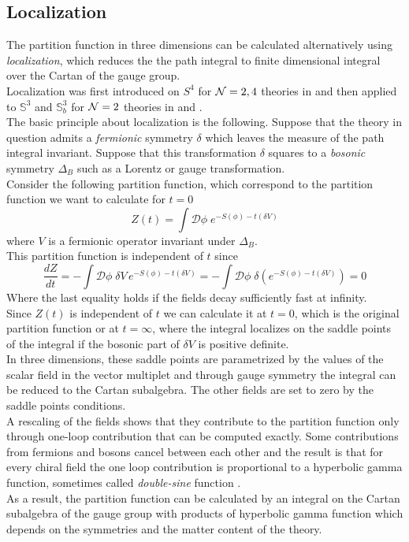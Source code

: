 \subsection{Localization}
The partition function in three dimensions can be calculated alternatively using \emph{localization}, which reduces the the path integral to finite dimensional integral over the Cartan of the gauge group.\\
Localization was first introduced on $S^4$ for $\mathcal{N}=2,4$ theories in \cite{Pestun:2007rz} and then applied to $\mathbb{S}^3$ and $\mathbb{S}_b^3$ for $\mathcal{N}=2$ theories in \cite{Kapustin:2009kz} and \cite{Hama:2011ea}.\\
The basic principle about localization is the following.
Suppose that the theory in question admits a \emph{fermionic} symmetry $\delta$ which leaves the measure of the path integral invariant.
Suppose that this transformation $\delta$ squares to a \emph{bosonic} symmetry $\Delta_B$ such as a Lorentz or gauge transformation.\\
Consider the following partition function, which correspond to the partition function we want to calculate for $t=0$
\begin{equation}
Z(t) = \int \mathcal{D} \phi \; e^{- S(\phi) - t (\delta V)}
\end{equation}
where $V$ is a fermionic operator invariant under $\Delta_B$.\\
This partition function is independent of $t$ since
\begin{equation}
 \frac{d Z}{d t} = - \int \mathcal{D} \phi \; \delta V \, e^{- S(\phi) - t (\delta V)} =  - \int  \mathcal{D} \phi \; \delta \left( e^{- S(\phi) - t (\delta V)  }\right) = 0
\end{equation}
Where the last equality holds if the fields decay sufficiently fast at infinity.\\
Since $Z(t)$ is independent of $t$ we can calculate it at $t=0$, which is the original partition function or at $t=\infty$, where the integral localizes on the saddle points of the integral if the bosonic part of $\delta V$ is positive definite.\\
In three dimensions, these saddle points are parametrized by the values of the scalar field in the vector multiplet and through gauge symmetry the integral can be reduced to the Cartan subalgebra. 
The other fields are set to zero by the saddle points conditions.\\
A rescaling of the fields shows that they contribute to the partition function only through one-loop contribution that can be computed exactly.
Some contributions from fermions and bosons cancel between each other and the result is that for every chiral field the one loop contribution is proportional to a hyperbolic gamma function, sometimes called \emph{double-sine} function \cite{Hama:2011ea}.\\
As a result, the partition function can be calculated by an integral on the Cartan subalgebra of the gauge group with products of hyperbolic gamma function which depends on the symmetries and the matter content of the theory.
